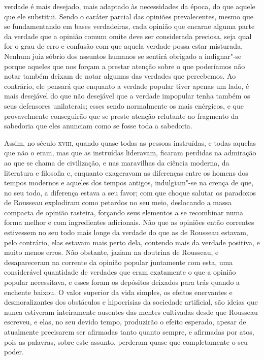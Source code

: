 verdade é mais desejado, mais adaptado às necessidades da época, do
que aquele que ele substitui. Sendo o caráter parcial das opiniões
prevalecentes, mesmo que se fundamentando em bases verdadeiras, cada
opinião que encarne alguma parte da verdade que a opinião comum omite
deve ser considerada preciosa, seja qual for o grau de erro e confusão com
que aquela verdade possa estar misturada. Nenhum juiz sóbrio dos
assuntos humanos se sentirá obrigado a indignar"-se porque aqueles
que nos forçam a prestar atenção sobre o que poderíamos não notar também
deixam de notar algumas das verdades que percebemos. Ao contrário, ele
pensará que enquanto a verdade popular tiver apenas um lado, é mais
desejável do que não desejável que a verdade impopular tenha também os
seus defensores unilaterais; esses sendo normalmente os mais
enérgicos, e que provavelmente conseguirão que se preste atenção
relutante ao fragmento da sabedoria que eles anunciam como se fosse toda a sabedoria. 

Assim, no século \textsc{xviii}, quando quase todas as pessoas instruídas, e
todas aquelas que não o eram, mas que as instruídas lideravam, ficaram
perdidas na admiração ao que se chama de civilização, e nas maravilhas
da ciência moderna, da literatura e filosofia e, enquanto exageravam as
diferenças entre os homens dos tempos modernos e aqueles dos tempos
antigos, indulgiam"-se na crença de que, no seu todo, a diferença
estava a seu favor; com que choque salutar os paradoxos de Rousseau
explodiram como petardos no seu meio, deslocando a massa compacta de
opinião rasteira, forçando seus elementos a se recombinar numa forma
melhor e com ingredientes adicionais. Não que as opiniões então
correntes estivessem no seu todo mais longe da verdade do que as de
Rousseau estavam, pelo contrário, elas estavam mais perto dela,
contendo mais da verdade positiva, e muito menos erros. Não obstante,
jaziam na doutrina de Rousseau, e desapareceram na corrente da opinião
popular juntamente com esta, uma considerável quantidade de verdades
que eram exatamente o que a opinião popular necessitava, e esses foram
os depósitos deixados para trás quando a enchente baixou. O valor
superior da vida simples, os efeitos enervantes e desmoralizantes dos obstáculos e
hipocrisias da sociedade artificial, são ideias que nunca estiveram
inteiramente ausentes das mentes cultivadas desde que Rousseau
escreveu, e elas, no seu devido tempo, produzirão o efeito esperado,
apesar de atualmente precisarem ser afirmadas tanto quanto sempre, e
afirmadas por atos, pois as palavras, sobre este assunto, perderam
quase que completamente o seu poder.

